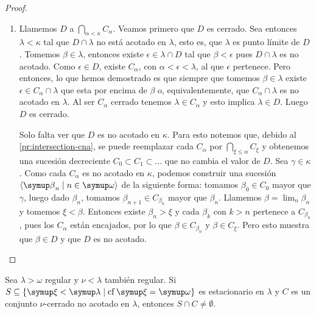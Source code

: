 \begin{proof}
\begin{enumerate}[label=\alph*)]
        \item Llamemos $D$ a $\dint_{\alpha<\kappa}C_\alpha$. Veamos primero que $D$ es cerrado.
            Sea entonces $\lambda<\kappa$ tal que $D\cap\lambda$
            no está acotado en $\lambda$, esto es, que $\lambda$ es punto límite de $D$.
            Tomemos $\beta\in\lambda$,
            entonces existe $\epsilon\in\lambda\cap D$ tal que $\beta<\epsilon$ pues
            $D\cap\lambda$ es no acotado.
            Como $\epsilon\in D$, existe $C_\alpha$, con $\alpha<\epsilon<\lambda$,
            al que $\epsilon$ pertenece.
            Pero entonces, lo que hemos demostrado es que siempre que tomemos $\beta\in\lambda$
            existe $\epsilon\in C_\alpha\cap\lambda$ que esta por encima de $\beta$ o, equivalentemente,
            que $C_\alpha\cap\lambda$ es no acotado en $\lambda$.
            Al ser $C_\alpha$ cerrado tenemos $\lambda\in C_\alpha$ y esto implica
            $\lambda\in D$. Luego $D$ es cerrado.

            Solo falta ver que $D$ es no acotado en $\kappa$.
            Para esto notemos que, debido al \cref{pr:intersection-cna},
            se puede reemplazar cada $C_\alpha$ por $\bigcap_{\xi\leq\alpha} C_\xi$
            y obtenemos una sucesión decreciente $C_0\subset C_1\subset\dots$
            que no cambia el valor de $D$.
            Sea $\gamma\in\kappa$. Como cada $C_\alpha$ es no acotado en $\kappa$,
            podemos construir una sucesión $\seq{\beta_n\mid n\in\omega}$ de la siguiente forma:
            tomamos $\beta_0\in C_0$ mayor que $\gamma$, luego dado $\beta_n$, tomamos
            $\beta_{n+1} \in C_{\beta_n}$ mayor que $\beta_n$. Llamemos $\beta = \lim_n\beta_n$
            y tomemos $\xi<\beta$. Entonces existe $\beta_n>\xi$ y cada $\beta_k$ con $k>n$
            pertenece a $C_{\beta_n}$, pues los $C_\alpha$ están encajados,
            por lo que $\beta\in C_{\beta_n}$ y $\beta\in C_\xi$.
            Pero esto muestra que $\beta\in D$ y que $D$ es no acotado.
    \end{enumerate}
\end{proof}

\begin{teo}\label{teo:stationary-intersect}
    Sea $\lambda>\omega$ regular y $\nu<\lambda$ también regular.
    Si $S\subseteq\set{\xi<\lambda\mid \cf\xi=\omega}$ es estacionario en $\lambda$
    y $C$ es un conjunto $\nu$-cerrado no acotado en $\lambda$, entonces $S\cap C\neq\emptyset$.
\end{teo}

